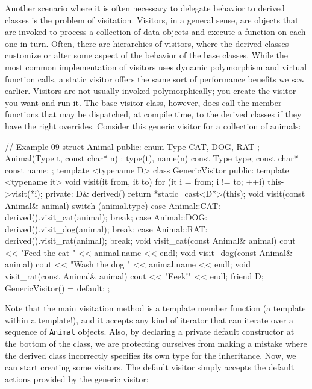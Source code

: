 Another scenario where it is often necessary to delegate behavior to derived classes is the problem of visitation. Visitors, in a general sense, are objects that are invoked to process a collection of data objects and execute a function on each one in turn. Often, there are hierarchies of visitors, where the derived classes customize or alter some aspect of the behavior of the base classes. While the most common implementation of visitors uses dynamic polymorphism and virtual function calls, a static visitor offers the same sort of performance benefits we saw earlier. Visitors are not usually invoked polymorphically; you create the visitor you want and run it. The base visitor class, however, does call the member functions that may be dispatched, at compile time, to the derived classes if they have the right overrides. Consider this generic visitor for a collection of animals:

\begin{code}
// Example 09
struct Animal {
  public:
  enum Type { CAT, DOG, RAT };
  Animal(Type t, const char* n) : type(t), name(n) {}
  const Type type;
  const char* const name;
};
template <typename D> class GenericVisitor {
  public:
  template <typename it> void visit(it from, it to) {
    for (it i = from; i != to; ++i) {
      this->visit(*i);
    }
  }
  private:
  D& derived() { return *static_cast<D*>(this); }
  void visit(const Animal& animal) {
    switch (animal.type) {
      case Animal::CAT:
        derived().visit_cat(animal); break;
      case Animal::DOG:
        derived().visit_dog(animal); break;
      case Animal::RAT:
        derived().visit_rat(animal); break;
    }
  }
  void visit_cat(const Animal& animal) {
    cout << "Feed the cat " << animal.name << endl;
  }
  void visit_dog(const Animal& animal) {
    cout << "Wash the dog " << animal.name << endl;
  }
  void visit_rat(const Animal& animal) {
  cout << "Eeek!" << endl;
}
  friend D;
  GenericVisitor() = default;
};
\end{code}

Note that the main visitation method is a template member function (a template within a template!), and it accepts any kind of iterator that can iterate over a sequence of \texttt{Animal} objects. Also, by declaring a private default constructor at the bottom of the class, we are protecting ourselves from making a mistake where the derived class incorrectly specifies its own type for the inheritance. Now, we can start creating some visitors. The default visitor simply accepts the default actions provided by the generic visitor:

